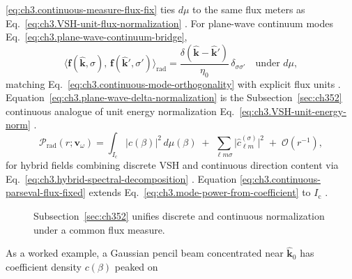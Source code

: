 \eqref{eq:ch3.continuous-measure-flux-fix} ties \(d\mu\) to the same flux meters as
Eq.~\eqref{eq:ch3.VSH-unit-flux-normalization} \cite{poynting1884}.
For plane-wave continuum modes Eq.~\eqref{eq:ch3.plane-wave-continuum-bridge},
\begin{equation}
\label{eq:ch3.plane-wave-delta-normalization}
\big\langle \mathbf{f}(\hat{\mathbf{k}},\sigma),\,\mathbf{f}(\hat{\mathbf{k}}',\sigma')\big\rangle_{\mathrm{rad}}
=
\frac{\delta(\hat{\mathbf{k}}-\hat{\mathbf{k}}')}{\eta_0}\,\delta_{\sigma\sigma'}
\quad\text{under }d\mu,
\end{equation}
matching Eq.~\eqref{eq:ch3.continuous-mode-orthogonality} with explicit flux units \cite{jackson1999}.
Equation~\eqref{eq:ch3.plane-wave-delta-normalization} is the Subsection~\ref{sec:ch352} continuous analogue of unit
energy normalization Eq.~\eqref{eq:ch3.VSH-unit-energy-norm} \cite{hansen1988}.
\begin{equation}
\label{eq:ch3.continuous-parseval-flux-fixed}
\mathcal{P}_{\mathrm{rad}}(r;\mathbf{v}_\omega)
=
\int_{I_{\mathrm{c}}}
\big|c(\beta)\big|^{2}\,d\mu(\beta)
\;+\;
\sum_{\ell m\sigma}\big|\widehat{c}_{\ell m}^{(\sigma)}\big|^{2}
\;+\;\mathcal{O}(r^{-1}),
\end{equation}
for hybrid fields combining discrete VSH and continuous direction content via
Eq.~\eqref{eq:ch3.hybrid-spectral-decomposition} \cite{stratton1941}. Equation
\eqref{eq:ch3.continuous-parseval-flux-fixed} extends Eq.~\eqref{eq:ch3.mode-power-from-coefficient} to
\(I_{\mathrm{c}}\) \cite{hansen1988}.
\begin{figure}[t]
\centering
{}
\caption{Subsection~\ref{sec:ch352} unifies discrete and continuous normalization under a common flux measure.}
\label{fig:ch3.352-hybrid-measure}
\end{figure}
As a worked example, a Gaussian pencil beam concentrated near \(\hat{\mathbf{k}}_{0}\) has coefficient density \(c(\beta)\) peaked on
